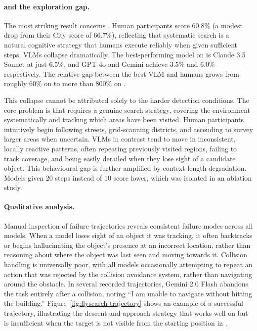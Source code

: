 \paragraph{\hardchallenge{} and the exploration gap.} The most striking result concerns \hardchallenge{}. Human participants score 60.8\% (a modest drop from their \challenge{} City score of 66.7\%), reflecting that systematic search is a natural cognitive strategy that humans execute reliably when given sufficient steps. VLMs collapse dramatically. The best-performing model on \hardchallenge{} is Claude 3.5 Sonnet at just 6.5\%, and GPT-4o and Gemini achieve 3.5\% and 6.0\% respectively. The relative gap between the best VLM and humans grows from roughly 60\% on \challenge{} to more than 800\% on \hardchallenge{}.

This collapse cannot be attributed solely to the harder detection conditions. The core problem is that \hardchallenge{} requires a genuine search strategy, covering the environment systematically and tracking which areas have been visited. Human participants intuitively begin following streets, grid-scanning districts, and ascending to survey larger areas when uncertain. VLMs in contrast tend to move in inconsistent, locally reactive patterns, often repeating previously visited regions, failing to track coverage, and being easily derailed when they lose sight of a candidate object. This behavioural gap is further amplified by context-length degradation. Models given 20 steps instead of 10 score lower, which was isolated in an ablation study.

\paragraph{Qualitative analysis.} Manual inspection of failure trajectories reveals consistent failure modes across all models. When a model loses sight of an object it was tracking, it often backtracks or begins hallucinating the object's presence at an incorrect location, rather than reasoning about where the object was last seen and moving towards it. Collision handling is universally poor, with all models occasionally attempting to repeat an action that was rejected by the collision avoidance system, rather than navigating around the obstacle. In several recorded trajectories, Gemini 2.0 Flash abandons the task entirely after a collision, noting ``I am unable to navigate without hitting the building.'' Figure~\ref{fig:flysearch-trajectory} shows an example of a successful trajectory, illustrating the descent-and-approach strategy that works well on \challenge{} but is insufficient when the target is not visible from the starting position in \hardchallenge{}.

